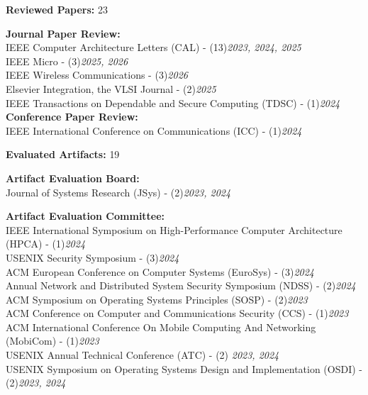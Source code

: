 \documentclass[letterpaper,11pt]{article}
\begin{document}
    \small{\item{
        \textbf{\large Reviewed Papers:} {\large 23}\hfill \\ \vspace{3pt}
    
        \textbf{Journal Paper Review:} 
        \\ IEEE Computer Architecture Letters (CAL) - (13)\hfill \textit{2023, 2024, 2025} 
        \\ IEEE Micro - (3)\hfill \textit{2025, 2026} 
        \\ IEEE Wireless Communications - (3)\hfill \textit{2026} 
        \\ Elsevier Integration, the VLSI Journal - (2)\hfill \textit{2025}
        \\ IEEE Transactions on Dependable and Secure Computing (TDSC) - (1)\hfill \textit{2024} \\ 
        \vspace{3pt}
        \textbf{Conference Paper Review:} \\ 
        IEEE International Conference on Communications (ICC) - (1)\hfill \textit{2024} \\ 
        \vspace{5pt}

        \textbf{\large Evaluated Artifacts:} {\large 19}\hfill \\ \vspace{3pt}

        \textbf{Artifact Evaluation Board:} \\ 
        Journal of Systems Research (JSys) - (2)\hfill \textit{2023, 2024} \\ \vspace{3pt}

        \textbf{Artifact Evaluation Committee:} \\ 
        IEEE International Symposium on High-Performance Computer Architecture (HPCA) - (1)\hfill \textit{2024} \\ 
        USENIX Security Symposium - (3)\hfill \textit{2024} \\ 
        ACM European Conference on Computer Systems (EuroSys) - (3)\hfill \textit{2024} \\
        Annual Network and Distributed System Security Symposium (NDSS) - (2)\hfill \textit{2024} \\
        ACM Symposium on Operating Systems Principles (SOSP) - (2)\hfill \textit{2023} \\
        ACM Conference on Computer and Communications Security (CCS) - (1)\hfill \textit{2023} \\
        ACM International Conference On Mobile Computing And Networking (MobiCom) - (1)\hfill \textit{2023} \\
        USENIX Annual Technical Conference (ATC) - (2) \hfill \textit{2023, 2024} \\
        USENIX Symposium on Operating Systems Design and Implementation (OSDI) - (2)\hfill \textit{2023, 2024} \\ \vspace{5pt}

}}
\end{document}
